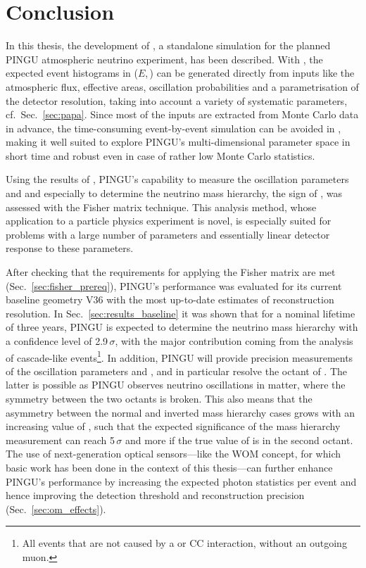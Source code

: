 \chapter{Conclusion}
\label{sec:conclusion}

In this thesis, the development of \papa, a standalone simulation for the
planned PINGU atmospheric neutrino experiment, has been described. With \papa,
the expected event histograms in ($E$,\,\coszen) can be generated directly from
inputs like the atmospheric flux, effective areas, oscillation probabilities
and a parametrisation of the detector resolution, taking into account a variety
of systematic parameters, cf.\ Sec.~\ref{sec:papa}. Since most of the inputs are
extracted from Monte Carlo data in advance, the time-consuming event-by-event
simulation can be avoided in \papa, making it well suited to explore PINGU's
multi-dimensional parameter space in short time and robust even in case of
rather low Monte Carlo statistics.

Using the results of \papa, PINGU's capability to measure the oscillation
parameters  and  and especially to determine the neutrino mass
hierarchy, \ie the sign of , was assessed with the Fisher matrix
technique. This analysis method, whose application to a particle physics
experiment is novel, is especially suited for problems with a large number of
parameters and essentially linear detector response to these parameters.

After checking that the requirements for applying the Fisher matrix are met
(Sec.~\ref{sec:fisher_prereq}), PINGU's performance was evaluated for its
current baseline geometry V36 with the most up-to-date estimates of
reconstruction resolution. In Sec.~\ref{sec:results_baseline} it was shown
that for a nominal lifetime of three years, PINGU is expected to determine the
neutrino mass hierarchy with a confidence level of 2.9\,$\sigma$, with the major
contribution coming from the analysis of cascade-like events\footnote{All events
that are not caused by a \numu or \numubar CC interaction, \ie without an
outgoing muon.}. In addition, PINGU will provide precision measurements of the
oscillation parameters  and , and in particular resolve the
octant of . The latter is possible as PINGU observes neutrino
oscillations in matter, where the symmetry between the two octants is broken.
This also means that the asymmetry between the normal and inverted mass
hierarchy cases grows with an increasing value of , such that the
expected significance of the mass hierarchy measurement can reach 5\,$\sigma$
and more if the true value of  is in the second octant.
The use of next-generation optical sensors---like the WOM concept, for which
basic work has been done in the context of this thesis---can further enhance
PINGU's performance by increasing the expected photon statistics per event and
hence improving the detection threshold and reconstruction precision
(Sec.~\ref{sec:om_effects}).

